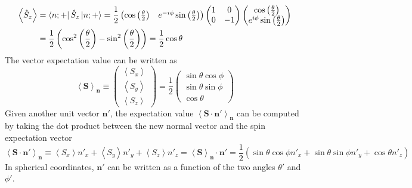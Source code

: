 \begin{sol}
\begin{equation}
\begin{aligned}
        \end{aligned}
    \end{equation}
    \begin{equation}
        \begin{aligned}
            \left<\hat{S}_z \right> &= \bra{n;+}\hat{S}_z\ket{n;+}=\frac{1}{2}\begin{pmatrix} \cos\left( \frac{\theta}{2} \right)& e^{-i\phi}\sin\left( \frac{\theta}{2} \right)  \end{pmatrix} 
            \begin{pmatrix} 1&0\\0&-1 \end{pmatrix}\begin{pmatrix} \cos\left( \frac{\theta}{2} \right)\\e^{i\phi}\sin\left( \frac{\theta}{2} \right)   \end{pmatrix}\\
            &=\frac{1}{2}\left(\cos^2\left( \frac{\theta}{2} \right)-\sin^2\left( \frac{\theta}{2} \right)\right)=\frac{1}{2}\cos\theta  
        \end{aligned}
    \end{equation}  
    The vector expectation value can be written as
    \begin{equation}
        \left<\mathbf{S} \right>_\mathbf{n}\equiv\begin{pmatrix} \left<S_x \right>\\\left<S_y \right>\\\left<S_z \right> \end{pmatrix} =\frac{1}{2}\begin{pmatrix} \sin\theta\cos\phi\\ \sin\theta\sin\phi \\ \cos\theta \end{pmatrix}
    \end{equation}
    Given another unit vector $\mathbf{n'}$, the expectation value $\left<\mathbf{S}\cdot\mathbf{n'} \right>_\mathbf{n}$ can be computed by taking the dot product between the new normal vector and the spin expectation vector
    \begin{equation}
        \left<\mathbf{S}\cdot\mathbf{n'} \right>_\mathbf{n}\equiv \left<S_x \right>n'_x+\left<S_y \right>n'_y+\left<S_z \right>n'_z=\left<\mathbf{S} \right>_\mathbf{n}\cdot\mathbf{n'}=\frac{1}{2}\left(\sin\theta\cos\phi n'_x+\sin\theta\sin\phi n'_y+\cos\theta n'_z\right)
    \end{equation}
    In spherical coordinates, $\mathbf{n'}$ can be written as a function of the two angles $\theta'$ and $\phi'$.

\end{sol}
